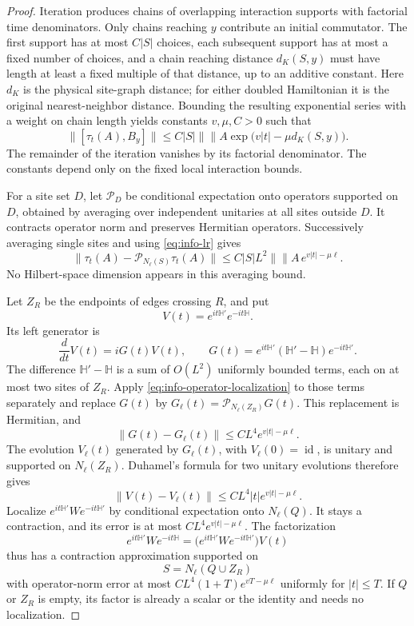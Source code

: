 \documentclass[11pt]{article}
\numberwithin{equation}{section}
\theoremstyle{definition}
\theoremstyle{remark}
\begin{document}
\begin{proof}
Iteration produces chains of overlapping interaction supports with
factorial time denominators.  Only chains reaching $y$ contribute an
initial commutator.  The first support has at most $C|S|$ choices,
each subsequent support has at most a fixed number of choices, and a
chain reaching distance $d_K(S,y)$ must have length at least a fixed
multiple of that distance, up to an additive constant.  Here $d_K$
is the physical site-graph distance; for either doubled Hamiltonian
it is the original nearest-neighbor distance.  Bounding the resulting
exponential series with a weight on chain length yields constants
$v,\mu,C>0$ such that
\begin{equation}
 \lVert [\tau_t(A),B_y]\rVert
       \le C|S|\lVert \rVert A\exp\bigl(v|t|-\mu d_K(S,y)\bigr).
 \label{eq:info-lr}
\end{equation}
The remainder of the iteration vanishes by its factorial denominator.
The constants depend only on the fixed local interaction bounds.

For a site set $D$, let $\mathcal P_D$ be conditional expectation
onto operators supported on $D$, obtained by averaging over independent
unitaries at all sites outside $D$.  It contracts operator norm and
preserves Hermitian operators.  Successively averaging single sites
and using \eqref{eq:info-lr} gives
\begin{equation}
 \lVert \tau_t(A)-\mathcal P_{N_\ell(S)}\tau_t(A)\rVert
       \le C|S|L^2\lVert \rVert A\,e^{v|t|-\mu\ell}.
 \label{eq:info-operator-localization}
\end{equation}
No Hilbert-space dimension appears in this averaging bound.

Let $Z_R$ be the endpoints of edges crossing $R$, and put
\[
 V(t)=e^{it\mathbb H'}e^{-it\mathbb H}.
\]
Its left generator is
\[
 \frac{d}{dt}V(t)=iG(t)V(t),\qquad
 G(t)=e^{it\mathbb H'}(\mathbb H'-\mathbb H)e^{-it\mathbb H'}.
\]
The difference $\mathbb H'-\mathbb H$ is a sum of $O(L^2)$ uniformly
bounded terms, each on at most two sites of $Z_R$.  Apply
\eqref{eq:info-operator-localization} to those terms separately and
replace $G(t)$ by
$G_\ell(t)=\mathcal P_{N_\ell(Z_R)}G(t)$.  This replacement is
Hermitian, and
\[
 \lVert G(t)-G_\ell(t)\rVert\le CL^4e^{v|t|-\mu\ell}.
\]
The evolution $V_\ell(t)$ generated by $G_\ell(t)$, with
$V_\ell(0)=\operatorname{id}$, is unitary and supported on $N_\ell(Z_R)$.  Duhamel's formula for two unitary
evolutions therefore gives
\[
 \lVert V(t)-V_\ell(t)\rVert\le CL^4|t|e^{v|t|-\mu\ell}.
\]
Localize $e^{it\mathbb H'}We^{-it\mathbb H'}$ by conditional
expectation onto $N_\ell(Q)$.  It stays a contraction, and its error
is at most $CL^4e^{v|t|-\mu\ell}$.  The factorization
\[
 e^{it\mathbb H'}We^{-it\mathbb H}
   =\bigl(e^{it\mathbb H'}We^{-it\mathbb H'}\bigr)V(t)
\]
thus has a contraction approximation supported on
\[
 S=N_\ell(Q\cup Z_R)
\]
with operator-norm error at most
$CL^4(1+T)e^{vT-\mu\ell}$ uniformly for $|t|\le T$.
If $Q$ or $Z_R$ is empty, its factor is already a scalar or the
identity and needs no localization.


\end{proof}
\end{document}
